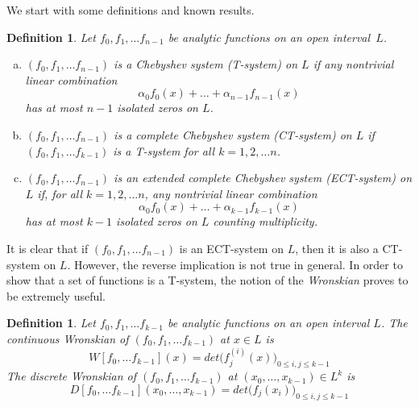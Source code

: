 \documentclass[12pt,psamsfonts]{amsart}
\newtheorem{definition}[theorem]{Definition}
\begin{document}
We start with some  definitions and known results.

\begin{definition}

Let $f_0,f_1, \dots f_{n-1}$ be analytic functions on an open interval~$L$.
\begin{enumerate}[(a)]
    \item  $(f_0,f_1, \dots f_{n-1})$ is a \emph{Chebyshev system} (T-system) on $L$ if
    any nontrivial linear combination
    \begin{equation*}
            \alpha_0 f_0(x)+ \dots + \alpha_{n-1} f_{n-1}(x)
    \end{equation*}
             has at most $n-1$ isolated zeros on $L$.
    \item  $(f_0,f_1, \dots f_{n-1})$ is a \emph{complete Chebyshev system} (CT-system) on $L$ if
               $(f_0,f_1, \dots f_{k-1})$ is a T-system for all $k=1,2,\dots n$.
    \item  $(f_0,f_1, \dots f_{n-1})$ is an \emph{ extended complete Chebyshev system} (ECT-system)
    on $L$ if, for all $k=1,2,\dots n$, any nontrivial linear combination
    \begin{equation*}
            \alpha_0 f_0(x)+ \dots + \alpha_{k-1} f_{k-1}(x)
    \end{equation*}
             has at most $k-1$ isolated zeros on $L$ counting multiplicity.
\end{enumerate}

 \end{definition}

It is clear that if $(f_0,f_1, \dots f_{n-1})$ is an ECT-system on $L$, then it is also a
CT-system on $L$.
However, the reverse implication is not true in general.
In order to show that a set of functions is a T-system, the notion of the \emph{Wronskian}
proves to be extremely useful.

\begin{definition}
Let $f_0,f_1, \dots f_{k-1}$ be analytic functions on an open interval $L$.
The \emph{continuous Wronskian} of $(f_0,f_1, \dots f_{k-1})$ at $x\in L$ is
\begin{equation*}
    W[f_0,\dots f_{k-1}](x)=det\bigg(f_j^{(i)}(x)\bigg )_{0\leq i,j\leq k-1}
    \end{equation*}
The \emph{discrete Wronskian} of $(f_0,f_1, \dots f_{k-1})$ at $(x_0,\dots, x_{k-1})\in L^k$ is
\begin{equation*}
    D[f_0,\dots f_{k-1}](x_0,\dots,x_{k-1})=det\bigg(f_j(x_i)\bigg)_{0\leq i,j\leq k-1}
\end{equation*}
\end{definition}
\end{document}
